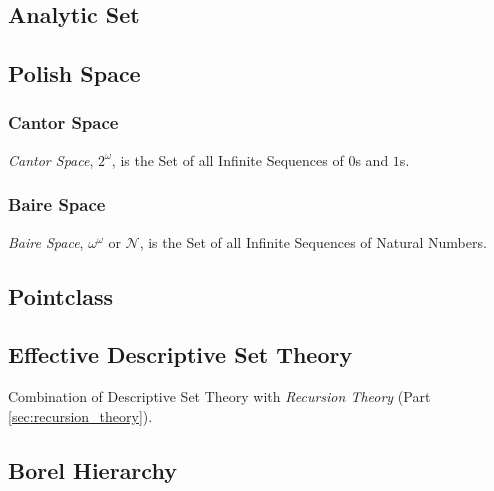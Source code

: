 \subsection{Analytic Set}\label{sec:analytic_set}

\subsection{Polish Space}\label{sec:polish_space}

\subsubsection{Cantor Space}

\emph{Cantor Space}, $2^{\omega}$, is the Set of all Infinite
Sequences of $0$s and $1$s.



\subsubsection{Baire Space}

\emph{Baire Space}, $\omega^{\omega}$ or $\mathcal{N}$, is the Set of
all Infinite Sequences of Natural Numbers.



\subsection{Pointclass}\label{sec:pointclass}

\subsection{Effective Descriptive Set Theory}

Combination of Descriptive Set Theory with \emph{Recursion Theory}
(Part \ref{sec:recursion_theory}).

\subsection{Borel Hierarchy}\label{sec:borel_hierarchy}



